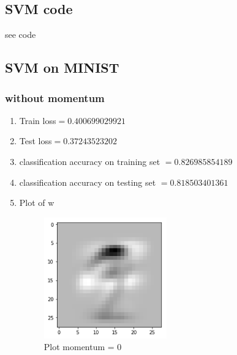 \documentclass[letterpaper, 12pt]{article}
\begin{document}
\subsection{SVM code}
see code

\subsection{SVM on MINIST}
\subsubsection{without momentum}
\begin{enumerate}
	\item Train loss$=0.400699029921$
	\item Test loss$=0.37243523202$
	\item classification accuracy on training set $= 0.826985854189$
	\item classification accuracy on testing set $=0.818503401361$
	\item Plot of w
	\begin{figure}[H]
\centering
\includegraphics[width=0.5\textwidth]{q2_3_1.png}
\caption{\label{}Plot momentum = 0 }
\end{figure}
\end{enumerate}
\end{document}
